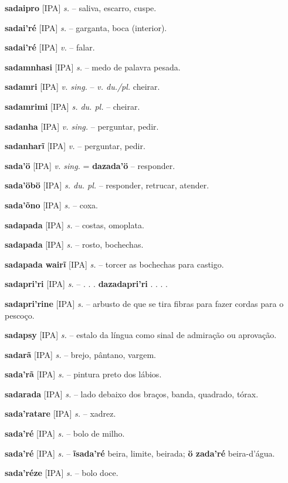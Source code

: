 \textbf{sadaipro} [IPA] \textit{s.} -- saliva, escarro, cuspe.

\textbf{sadai'ré} [IPA] \textit{s.} -- garganta, boca (interior).

\textbf{sadai'ré} [IPA] \textit{v.} -- falar.

\textbf{sadamnhasi} [IPA] \textit{s.} -- medo de palavra pesada.

\textbf{sadamri} [IPA] \textit{v. sing.} -- \textit{v. du./pl.} cheirar.

\textbf{sadamrimi} [IPA] \textit{s. du. pl.} -- cheirar.

\textbf{sadanha} [IPA] \textit{v. sing.} -- perguntar, pedir.

\textbf{sadanharĩ} [IPA] \textit{v.} -- perguntar, pedir.

\textbf{sada'ö} [IPA] \textit{v. sing.} = \textbf{dazada'ö} -- responder.

\textbf{sada'öbö} [IPA] \textit{s. du. pl.} -- responder, retrucar, atender.

\textbf{sada'õno} [IPA] \textit{s.} -- coxa.

\textbf{sadapada} [IPA] \textit{s.} -- costas, omoplata.

\textbf{sadapada} [IPA] \textit{s.} -- rosto, bochechas.

\textbf{sadapada wairĩ} [IPA] \textit{s.} -- torcer as bochechas para castigo.

\textbf{sadapri'ri} [IPA] \textit{s.} -- . . . \textbf{dazadapri'ri} . . . .

\textbf{sadapri'rine} [IPA] \textit{s.} -- arbusto de que se tira fibras para fazer cordas para o pescoço.

\textbf{sadapsy} [IPA] \textit{s.} -- estalo da língua como sinal de admiração ou aprovação.

\textbf{sadarã} [IPA] \textit{s.} -- brejo, pântano, vargem.

\textbf{sada'rã} [IPA] \textit{s.} -- pintura preto dos lábios.

\textbf{sadarada} [IPA] \textit{s.} -- lado debaixo dos braços, banda, quadrado, tórax.

\textbf{sada'ratare} [IPA] \textit{s.} -- xadrez.

\textbf{sada'ré} [IPA] \textit{s.} -- bolo de milho.

\textbf{sada'ré} [IPA] \textit{s.} -- \textbf{ĩsada'ré} beira, limite, beirada; \textbf{ö zada'ré} beira-d'água.

\textbf{sada'réze} [IPA] \textit{s.} -- bolo doce.

